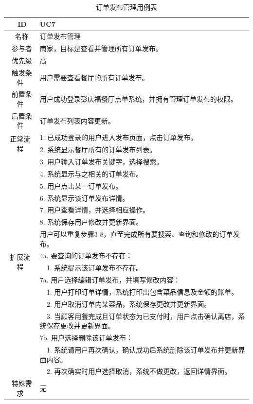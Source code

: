 \begin{table}[htbp!]
  \footnotesize
  \centering
  \caption{订单发布管理用例表}
  \vspace{2mm}
  \begin{tabular}{cp{11.5cm}}
   \hline
   \ ID & UC7 \\ 
   \hline
   \ 名称 & 订单发布管理 \\ 
   \hline
   \ 参与者 & 商家，目标是查看并管理所有订单发布。 \\ 
   \hline
   \ 优先级 & 高 \\ 
   \hline
   \ 触发条件 & 用户需要查看餐厅的所有订单发布。 \\ 
   \hline
   \ 前置条件 & 用户成功登录彭庆福餐厅点单系统，并拥有管理订单发布的权限。 \\ 
   \hline
   \ 后置条件 & 订单发布列表内容更新。 \\ 
   \hline
   \multirow{2}{*}{正常流程}
    & 1.	已成功登录的用户进入发布页面，点击订单发布。\\
    & 2.	系统显示餐厅所有的订单发布列表。\\
    & 3.	用户输入订单发布关键字，选择搜索。\\
    & 4.	系统显示与之相关的订单发布。\\
    & 5.  用户点击某一订单发布。\\
    & 6.  系统显示该订单发布详情。\\
    & 7.  用户查看详情，并选择相应操作。\\
    & 8.  系统保存用户修改并更新界面。\\
    & 用户可以重复步骤3-8，直至完成所有要搜索、查询和修改的订单发布。\\
   \hline
   \multirow{2}{*}{扩展流程}
    & 4a. 要查询的订单发布不存在：\\
    & ~~1.	系统提示该订单发布不存在。\\
    & 7a. 用户选择编辑订单发布，并填写修改内容：\\
    & ~~1.	用户打印订单详情，系统打印出包含菜品信息及金额的账单。\\
    & ~~2.	用户取消订单内某菜品，系统保存更改并更新界面。\\
    & ~~3.	当顾客用餐完成且订单状态为已支付时，用户点击确认离店，系统保存更改并更新界面。\\
    & 7b. 用户选择删除该订单发布：\\
    & ~~1.	系统请用户再次确认，确认成功后系统删除该订单发布并更新界面内容。\\
    & ~~2.	再次确实时用户选择取消，系统不做更改，返回详情界面。\\
  \hline
  \ 特殊需求 & 无 \\ 
  \hline
  \end{tabular}
  \label{table:uc6}
\end{table}

